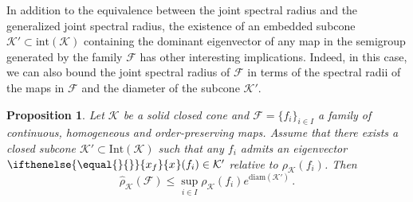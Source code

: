 \documentclass{article}
\newtheorem{proposition}[theorem]{Proposition}
\newcommand{\family}{\mathcal{F}}
\newcommand{\cradius}{\rho_{\cone}}
\newcommand{\cgradius}{\widehat{\rho}_{\cone}}
\newcommand{\cone}{\mathcal{K}}
\newcommand{\interior}{\mathrm{Int}}
\newcommand{\ceigenvector}[1][]{
  \ifthenelse{\equal{#1}{}}
  {{x_f}}
  {{x}_{#1}}}
\begin{document}
In addition to the equivalence between the joint spectral radius and the generalized joint spectral radius, the existence of an embedded subcone $\cone'\subset \mathrm{int}(\cone)$ containing the dominant eigenvector of any map in the semigroup generated by the family $\family$ has other interesting implications. Indeed, in this case, we can also bound the joint spectral radius of $\family$ in terms of the spectral radii of the maps in $\family$ and the diameter of the subcone $\cone'$. 
%
\begin{proposition}
    Let $\cone$ be a solid closed cone and $\family=\{f_i\}_{i\in I}$ a family of continuous, homogeneous and order-preserving maps. Assume that there exists a closed subcone $\cone'\subset \interior(\cone)$ such that any $f_i$ admits an eigenvector $\ceigenvector(f_i)\in\cone'$ relative to $\cradius(f_i)$. Then 
    \begin{equation}
        \cgradius(\family)\leq \sup_{i\in I}\cradius(f_i)e^{\mathrm{diam}(\cone')}\,.
    \end{equation}
\end{proposition}
\end{document}
